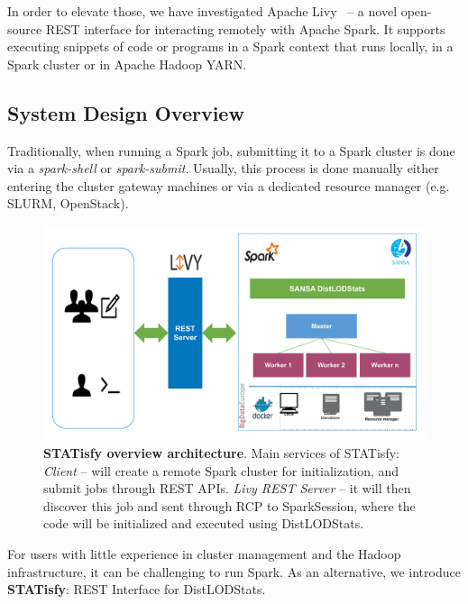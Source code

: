 In order to elevate those, we have investigated Apache Livy~ -- a novel open-source REST interface for interacting remotely with Apache Spark. It supports executing snippets of code or programs in a Spark context that runs locally, in a Spark cluster or in Apache Hadoop YARN.

\subsection{System Design Overview}
Traditionally, when running a Spark job, submitting it to a Spark cluster is done via a \textit{spark-shell} or \textit{spark-submit}.
Usually, this process is done manually either entering the cluster gateway machines or via a dedicated resource manager (e.g. SLURM, OpenStack). 

\begin{figure}
\centering
\includegraphics[width=1.0\columnwidth]{images/4_distlodstats/distlodstats-statisfy.pdf}
\caption{\textbf{STATisfy overview architecture}.
Main services of STATisfy: \textit{Client} -- will create a remote Spark cluster for initialization, and submit jobs through REST \gls{API}s.
\textit{Livy REST Server} -- it will then discover this job and sent through \gls{RCP} to SparkSession, where the code will be initialized and executed using DistLODStats.
}
\label{fig:STATisfy}
\end{figure}

For users with little experience in cluster management and the Hadoop infrastructure, it can be challenging to run Spark.
As an alternative, we introduce \textbf{STATisfy}: REST Interface for DistLODStats. 

